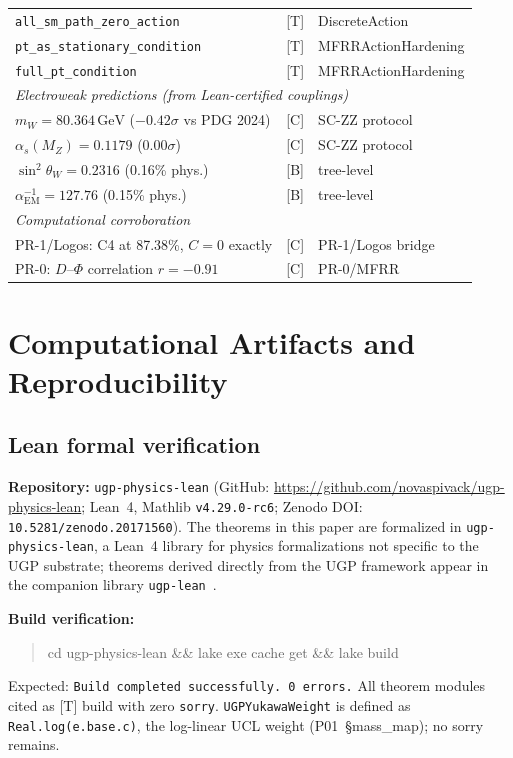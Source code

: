 \documentclass[12pt]{article}
\theoremstyle{remark}
\newcommand{\sinW}{\sin^2\!\theta_W}
\newcommand{\sorry}{\texttt{sorry}}
\newcommand{\lean}[1]{\texttt{#1}}
\begin{document}
\begin{longtable}{p{8.5cm}cp{3.5cm}}
\lean{all\_sm\_path\_zero\_action} & [T] & DiscreteAction \\
\lean{pt\_as\_stationary\_condition} & [T] & MFRRActionHardening \\
\lean{full\_pt\_condition} & [T] & MFRRActionHardening \\[2pt]
%
\multicolumn{3}{l}{\textit{Electroweak predictions (from Lean-certified couplings)}} \\
$m_W = 80.364\,\mathrm{GeV}$ ($-0.42\sigma$ vs PDG 2024) & [C] & SC-ZZ protocol \\
$\alpha_s(M_Z) = 0.1179$ ($0.00\sigma$) & [C] & SC-ZZ protocol \\
$\sinW = 0.2316$ (0.16\% phys.) & [B] & tree-level \\
$\alpha_\mathrm{EM}^{-1} = 127.76$ (0.15\% phys.) & [B] & tree-level \\[2pt]
%
\multicolumn{3}{l}{\textit{Computational corroboration}} \\
PR-1/Logos: C4 at 87.38\%, $C=0$ exactly & [C] & PR-1/Logos bridge \\
PR-0: $D$--$\Phi$ correlation $r = -0.91$ & [C] & PR-0/MFRR \\
\end{longtable}

\section{Computational Artifacts and Reproducibility}
\label{app:artifacts}

\subsection{Lean formal verification}

\textbf{Repository:} \texttt{ugp-physics-lean}
(GitHub: \url{https://github.com/novaspivack/ugp-physics-lean};
Lean~4, Mathlib \texttt{v4.29.0-rc6}; Zenodo DOI: \texttt{10.5281/zenodo.20171560}).
The theorems in this paper are formalized in \texttt{ugp-physics-lean}, a Lean~4 library for physics formalizations not specific to the UGP substrate; theorems derived directly from the UGP framework appear in the companion library \texttt{ugp-lean}~\cite{ugp-lean}.

\textbf{Build verification:}
\begin{quote}\small\ttfamily
cd ugp-physics-lean \&\& lake exe cache get \&\& lake build
\end{quote}
Expected: \texttt{Build completed successfully.  0 errors.}
All theorem modules cited as [T] build with zero \sorry.
\texttt{UGPYukawaWeight} is defined as \texttt{Real.log(e.base.c)},
the log-linear UCL weight (P01~\S mass\_map); no sorry remains.
\end{document}
